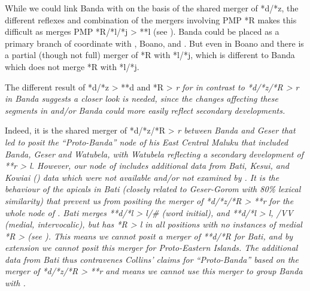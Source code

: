 
While we could link Banda with  on the basis
of the shared merger of *d/*z,
the different reflexes and combination of the mergers involving
PMP *R makes this difficult as  merges
PMP *R/*l/*j > **l (see ).
Banda could be placed as a primary branch of 
coordinate with , Boano, and .
But even in Boano
and  there is a partial (though not full) merger of *R with
*l/*j, which is different to Banda which does not merge *R with *l/*j.

The different result of *d/*z > **d
and *R > \it{r} for  in contrast
to *d/*z/*R > \it{r} in Banda suggests a closer look is needed,
since the changes affecting these segments in 
and/or Banda could more easily reflect secondary developments.

Indeed, it is the shared merger of *d/*z/*R > \it{r} between
Banda and Geser that led \citet[131ff]{Collins1986} to posit the “Proto-Banda”
node of his East Central Maluku that included Banda,
Geser and Watubela, with Watubela reflecting a secondary development
of **r > \it{l}.
However, our  node of 
includes additional data from Bati,
Kesui, and Kowiai () data which were not available
and/or not examined by \citet{Collins1986}.
It is the behaviour of the apicals in Bati (closely related to
Geser-Gorom with 80{\%} lexical similarity) that prevent us from
positing the merger of *d/*z/*R > **r for the whole  node of .
Bati merges **d/*l > \it{l}/{\#}{\gap} (word initial),
and **d/*l > \it{l},
{\0} /V{\gap}V (medial, intervocalic),
but has *R > \it{l} in all positions with no instances of medial
*R > {\0} (see ).
This means we cannot posit a merger of **d/*R for Bati,
and by extension we cannot posit this merger for Proto-Eastern Islands.
The additional data from Bati thus contravenes Collins’ claims
for “Proto-Banda” based on the merger of *d/*z/*R > **r
and means we cannot use this merger to group Banda with .

